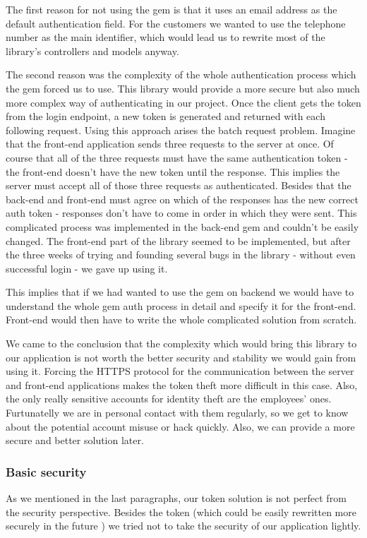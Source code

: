 The first reason for not using the gem is that it uses an email address as the default authentication field. For the customers we wanted to use the telephone number as the main identifier, which would lead us to rewrite most of the library's controllers and models anyway.

The second reason was the complexity of the whole authentication process which the gem forced us to use. This library would provide a more secure but also much more complex way of authenticating in our project. Once the client gets the token from the login endpoint, a new token is generated and returned with each following request. Using this approach arises the batch request problem. Imagine that the front-end application sends three requests to the server at once. Of course that all of the three requests must have the same authentication token - the front-end doesn't have the new token until the response. This implies the server must accept all of those three requests as authenticated. Besides that the back-end and front-end must agree on which of the responses has the new correct auth token - responses don't have to come in order in which they were sent. This complicated process was implemented in the back-end gem and couldn't be easily changed. The front-end part of the library seemed to be implemented, but after the three weeks of trying and founding several bugs in the library - without even successful login - we gave up using it.

This implies that if we had wanted to use the gem on backend we would have to understand the whole gem auth process in detail and specify it for the front-end. Front-end would then have to write the whole complicated solution from scratch. 

We came to the conclusion that the complexity which would bring this library to our application is not worth the better security and stability we would gain from using it. Forcing the HTTPS protocol for the communication between the server and front-end applications makes the token theft more difficult in this case. Also, the only really sensitive accounts for identity theft are the employees' ones. Furtunatelly we are in personal contact with them regularly, so we get to know about the potential account misuse or hack quickly. Also, we can provide a more secure and better solution later.

\subsubsection{Basic security}
	As we mentioned in the last paragraphs, our token solution is not perfect from the security perspective. Besides the token (which could be easily rewritten more securely in the future ) we tried not to take the security of our application lightly.
	
